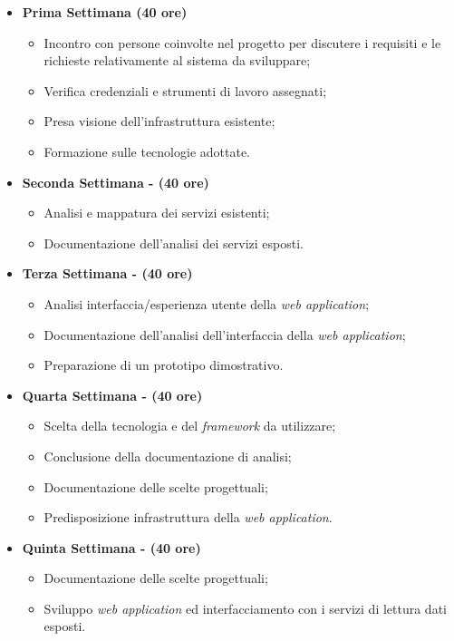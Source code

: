 \begin{itemize}
    \item \textbf{Prima Settimana (40 ore)}
    \begin{itemize}
        \item Incontro con persone coinvolte nel progetto per discutere i requisiti e le richieste relativamente al sistema da sviluppare;
        \item Verifica credenziali e strumenti di lavoro assegnati;
        \item Presa visione dell’infrastruttura esistente;
        \item Formazione sulle tecnologie adottate.
    \end{itemize}
    \item \textbf{Seconda Settimana - (40 ore)} 
    \begin{itemize}
        \item Analisi e mappatura dei servizi esistenti;
        \item Documentazione dell'analisi dei servizi esposti.
    \end{itemize}
    \item \textbf{Terza Settimana - (40 ore)} 
    \begin{itemize}
        \item Analisi interfaccia/esperienza utente della \textit{web application};
        \item Documentazione dell'analisi dell'interfaccia della \textit{web application};
        \item Preparazione di un prototipo dimostrativo.
    \end{itemize}
    \item \textbf{Quarta Settimana - (40 ore)} 
    \begin{itemize}
        \item Scelta della tecnologia e del \textit{framework} da utilizzare;
        \item Conclusione della documentazione di analisi;
        \item Documentazione delle scelte progettuali;
        \item Predisposizione infrastruttura della \textit{web application}.
    \end{itemize}
    \item \textbf{Quinta Settimana - (40 ore)} 
    \begin{itemize}
        \item Documentazione delle scelte progettuali;
        \item Sviluppo \textit{web application} ed interfacciamento con i servizi di lettura dati esposti.

\end{itemize}
\end{itemize}
